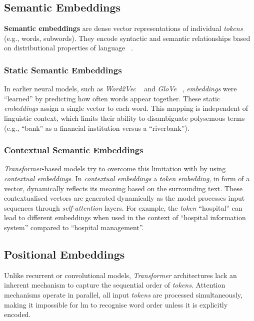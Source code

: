 \subsection{Semantic Embeddings}
%
\begin{definition}\label{def:semantic_embed}
\textbf{Semantic embeddings} are dense vector representations of individual \textit{tokens} (e.g., words, subwords).
They encode syntactic and semantic relationships based on distributional properties of language ~\citep{Mikolov2013EfficientEO, pennington2014glove}.
\end{definition}
%
\subsubsection{Static Semantic Embeddings}
%
In earlier neural models, such as \textit{Word2Vec} ~\citep{Mikolov2013EfficientEO} and \textit{GloVe} ~\citep{pennington2014glove}, \textit{embeddings} were \enquote{learned} by predicting how often words appear together.
These static \textit{embeddings} assign a single vector to each word.
This mapping is independent of linguistic context, which limits their ability to disambiguate polysemous terms (e.g., \enquote{bank} as a financial institution versus a \enquote{riverbank}).
%
\subsubsection{Contextual Semantic Embeddings}
%
\textit{Transformer}-based models try to overcome this limitation with by using \textit{contextual embeddings}. 
In \textit{contextual embeddings} a \textit{token} \textit{embedding}, in form of a vector, dynamically reflects its meaning based on the surrounding text.
These contextualised vectors are generated dynamically as the model processes input sequences through \textit{self-attention} layers.
For example, the \textit{token} \enquote{hospital} can lead to different embeddings when used in the context of \enquote{hospital information system} compared to \enquote{hospital management}.
%
\subsection{Positional Embeddings}\label{sub:position_embed_prel}
%
Unlike recurrent or convolutional models, \textit{Transformer} architectures lack an inherent mechanism to capture the sequential order of \textit{tokens}. 
Attention mechanisms operate in parallel, all input \textit{tokens} are processed simultaneously, making it impossible for \ac{lm} to recognise word order unless it is explicitly encoded.
%

